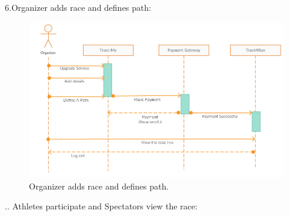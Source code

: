 6.Organizer adds race and defines path:
\begin{figure}[H]
	\begin{center}
		\includegraphics[width=\textwidth]{./Sequence/6_Organizer.png}
      	\caption{Organizer adds race and defines path.}
        \label{TrackMe_seq6}
	\end{center}
\end{figure}
.\newline\newline\newline\newline\newline\newline\newline\newline\newline\newline\newline\newline\newline\newline\newline\newline\newline\newline{}. Athletes participate and Spectators view the race:
